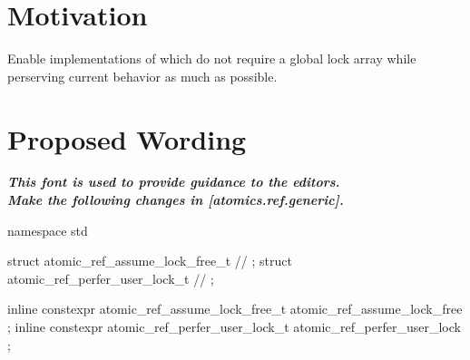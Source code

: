 \section*{Motivation}

Enable implementations of  which do not require a global lock array
while perserving current behavior as much as possible.

\section*{Proposed Wording}

\textbf{\textit{This font is used to provide guidance to the editors.}} \\

\textbf{\textit{Make the following changes in [atomics.ref.generic].}} \\

%
%

\begin{addedblock}
\begin{codeblock}
namespace std {
  struct atomic_ref_assume_lock_free_t {} // \expos;
  struct atomic_ref_perfer_user_lock_t {} // \expos;

  inline constexpr atomic_ref_assume_lock_free_t  atomic_ref_assume_lock_free {};
  inline constexpr atomic_ref_perfer_user_lock_t  atomic_ref_perfer_user_lock {};
}
\end{codeblock}
\end{addedblock}


